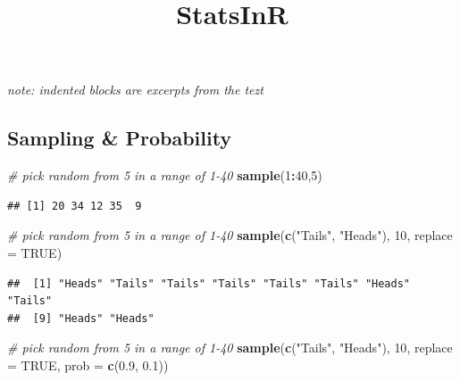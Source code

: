 \documentclass[]{article}
\title{StatsInR}
\author{}
\date{}
\newenvironment{Shaded}{\begin{snugshade}}{\end{snugshade}}
\newcommand{\KeywordTok}[1]{\textcolor[rgb]{0.13,0.29,0.53}{\textbf{#1}}}
\newcommand{\DataTypeTok}[1]{\textcolor[rgb]{0.13,0.29,0.53}{#1}}
\newcommand{\DecValTok}[1]{\textcolor[rgb]{0.00,0.00,0.81}{#1}}
\newcommand{\FloatTok}[1]{\textcolor[rgb]{0.00,0.00,0.81}{#1}}
\newcommand{\StringTok}[1]{\textcolor[rgb]{0.31,0.60,0.02}{#1}}
\newcommand{\CommentTok}[1]{\textcolor[rgb]{0.56,0.35,0.01}{\textit{#1}}}
\newcommand{\OtherTok}[1]{\textcolor[rgb]{0.56,0.35,0.01}{#1}}
\newcommand{\OperatorTok}[1]{\textcolor[rgb]{0.81,0.36,0.00}{\textbf{#1}}}
\newcommand{\NormalTok}[1]{#1}
\begin{document}
\maketitle

\emph{note: indented blocks are excerpts from the tezt}

\subsection{Sampling \& Probability}\label{sampling-probability}

\begin{Shaded}
\begin{Highlighting}[]
\CommentTok{# pick random from 5 in a range of 1-40}
\KeywordTok{sample}\NormalTok{(}\DecValTok{1}\OperatorTok{:}\DecValTok{40}\NormalTok{,}\DecValTok{5}\NormalTok{)}
\end{Highlighting}
\end{Shaded}

\begin{verbatim}
## [1] 20 34 12 35  9
\end{verbatim}

\begin{Shaded}
\begin{Highlighting}[]
\CommentTok{# pick random from 5 in a range of 1-40}
\KeywordTok{sample}\NormalTok{(}\KeywordTok{c}\NormalTok{(}\StringTok{"Tails"}\NormalTok{, }\StringTok{"Heads"}\NormalTok{), }\DecValTok{10}\NormalTok{, }\DataTypeTok{replace =} \OtherTok{TRUE}\NormalTok{)}
\end{Highlighting}
\end{Shaded}

\begin{verbatim}
##  [1] "Heads" "Tails" "Tails" "Tails" "Tails" "Tails" "Heads" "Tails"
##  [9] "Heads" "Heads"
\end{verbatim}

\begin{Shaded}
\begin{Highlighting}[]
\CommentTok{# pick random from 5 in a range of 1-40}
\KeywordTok{sample}\NormalTok{(}\KeywordTok{c}\NormalTok{(}\StringTok{"Tails"}\NormalTok{, }\StringTok{"Heads"}\NormalTok{), }\DecValTok{10}\NormalTok{, }\DataTypeTok{replace =} \OtherTok{TRUE}\NormalTok{, }\DataTypeTok{prob =} \KeywordTok{c}\NormalTok{(}\FloatTok{0.9}\NormalTok{, }\FloatTok{0.1}\NormalTok{))}
\end{Highlighting}
\end{Shaded}
\end{document}
